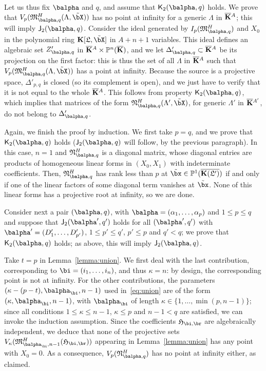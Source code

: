 \documentclass[12pt]{article}
\begin{document}
Let us thus fix $\balpha$ and $q$, and assume that
$\assJ_2(\balpha,q)$ holds. We prove that
$V_p(\mathfrak{M}^H_{\balpha,q}(\Lambda,\tilde\bX))$ has no point at
infinity for a generic $\Lambda$ in $\overline{\mathbf{K}}{}^A$; this will imply
$\assI_2(\balpha,q)$. Consider the ideal generated by
$I_{p}(\mathfrak{M}^H_{\balpha,q})$ and $X_0$ in the polynomial ring
$\KK[\mathfrak{L},\tilde\bX]$ in $A+n+1$ variables. This ideal defines
an algebraic set $Z'_{\balpha,q}$ in $\overline{\mathbf{K}}{}^A \times \mathbb{P}^n(\overline{\mathbf{K}})$,
and we let $\Delta'_{\balpha,q} \subset \KKbar{}^A$ be its projection
on the first factor: this is thus the set of all $\Lambda$ in
$\overline{\mathbf{K}}{}^A$ such that
$V_p(\mathfrak{M}^H_{\balpha,q}(\Lambda,\tilde\bX))$ has a point at
infinity. Because the source is a projective space, $\Delta'_{p,q}$ is
closed (so its complement is open), and we just have to verify that it
is not equal to the whole $\overline{\mathbf{K}}{}^A$. This follows from property
$\assJ_2(\balpha,q)$, which implies that matrices of the form
$\mathfrak{N}^H_{\balpha,q}(\Lambda',\tilde\bX)$, for generic
$\Lambda'$ in $\overline{\mathbf{K}}{}^{A'}$, do not belong to $\Delta'_{\balpha,q}$.

Again, we finish the proof by induction. We first take $p=q$, and we
prove that $\assJ_2(\balpha,q)$ holds ($\assI_2(\balpha,q)$ will follow,
by the previous paragraph). In this case, $n=1$ and
$\mathfrak{N}^H_{\balpha,q}$ is a diagonal matrix, whose diagonal entries
are products of homogeneous linear forms in $(X_0,X_1)$ with indeterminate
coefficients. Then, $\mathfrak{N}^H_{\balpha,q}$ has rank less than $p$ at
$\tilde\bx\in\P^1(\KKGpbar)$ if and only if one of the linear factors
of some diagonal term vanishes at $\tilde \bx$. None of this linear
forms has a projective root at infinity, so we are done.

Consider next a pair $(\balpha,q)$, with
$\balpha=(\alpha_1,\dots,\alpha_p)$ and $1 \le p \le q$ and suppose
that $\assI_2(\balpha',q')$ holds for all $(\balpha',q')$ with
$\balpha'=(D'_1,\dots,D'_{p'})$, $1 \le p' \le q'$, $p' \le p$ and $q'
< q$; we prove that $\assJ_2(\balpha,q)$ holds; as above, this will
imply $\assI_2(\balpha,q)$.

Take $t=p$ in Lemma~\ref{lemma:union}. We first deal with the last
contribution, corresponding to $\bi=(i_1,\dots,i_n)$, and thus
$\kappa=n$: by design, the corresponding point is not at infinity. For
the other contributions, the parameters $(\kappa-(p-t),\balpha_\bi,n-1)$
used in~\eqref{eq:union} are of the form $(\kappa,\balpha_\bi,n-1)$, with
$\balpha_\bi$ of length $\kappa \in \{1,\dots, \min(p,n-1)\}$; since all
conditions $1 \le \kappa \le n-1$, $\kappa \le p$ and $n-1 < q$ are satisfied,
we can invoke the induction assumption. Since the coefficients
$\mathfrak{H}_{\bi,\br}$ are algebraically independent, we deduce that
none of the projective sets
$V_\kappa(\mathfrak{M}^H_{\balpha_\bi,n-1}(\mathfrak{H}_{\bi,\br}))$ appearing in
Lemma~\ref{lemma:union} has any point with $X_0=0$. As a consequence,
$V_p(\mathfrak{N}^H_{\balpha,q})$ has no point at infinity either, as
claimed.
\end{document}
